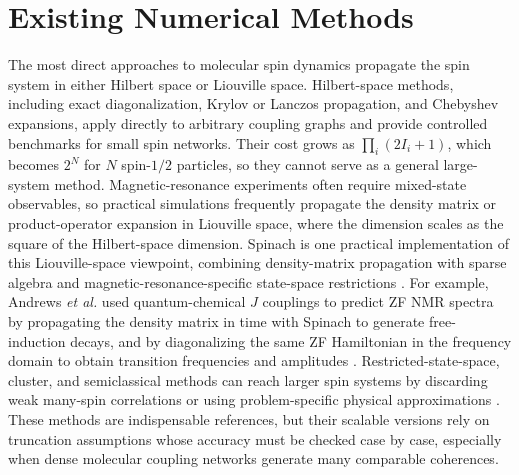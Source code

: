 \documentclass[12pt]{article}
\begin{document}
\section{Existing Numerical Methods}

The most direct approaches to molecular spin dynamics propagate the spin system in either Hilbert space or Liouville space.
Hilbert-space methods, including exact diagonalization, Krylov or Lanczos propagation, and Chebyshev expansions, apply directly to arbitrary coupling graphs and provide controlled benchmarks for small spin networks.
Their cost grows as $\prod_i(2I_i+1)$, which becomes $2^N$ for $N$ spin-$1/2$ particles, so they cannot serve as a general large-system method.
Magnetic-resonance experiments often require mixed-state observables, so practical simulations frequently propagate the density matrix or product-operator expansion in Liouville space, where the dimension scales as the square of the Hilbert-space dimension.
Spinach is one practical implementation of this Liouville-space viewpoint, combining density-matrix propagation with sparse algebra and magnetic-resonance-specific state-space restrictions \cite{Hogben2011Spinach}.
For example, Andrews \textit{et al.} used quantum-chemical $J$ couplings to predict ZF NMR spectra by propagating the density matrix in time with Spinach to generate free-induction decays, and by diagonalizing the same ZF Hamiltonian in the frequency domain to obtain transition frequencies and amplitudes \cite{andrewsDFTassistedNaturalAbundance2026}.
Restricted-state-space, cluster, and semiclassical methods can reach larger spin systems by discarding weak many-spin correlations or using problem-specific physical approximations \cite{Kuprov2011PolynomialStateSpace,Yang2008ClusterCorrelation,Lindoy2014ImprovedSemiclassical}.
These methods are indispensable references, but their scalable versions rely on truncation assumptions whose accuracy must be checked case by case, especially when dense molecular coupling networks generate many comparable coherences.
\end{document}
